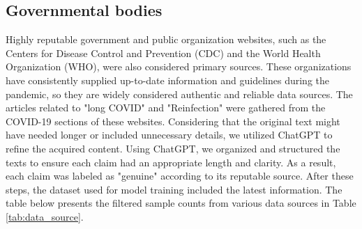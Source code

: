 \subsection{Governmental bodies}
Highly reputable government and public organization websites, such as the Centers for Disease Control and Prevention (CDC) and the World Health Organization (WHO), were also considered primary sources. These organizations have consistently supplied up-to-date information and guidelines during the pandemic, so they are widely considered authentic and reliable data sources. 
The articles related to "long COVID" and "Reinfection" were gathered from the COVID-19 sections of these websites. Considering that the original text might have needed longer or included unnecessary details, we utilized ChatGPT \cite{b8} to refine the acquired content. Using ChatGPT, we organized and structured the texts to ensure each claim had an appropriate length and clarity. As a result, each claim was labeled as "genuine" according to its reputable source. After these steps, the dataset used for model training included the latest information.
The table below presents the filtered sample counts from various data sources in Table \ref{tab:data_source}.

